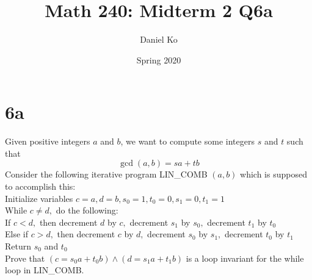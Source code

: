 \documentclass[11pt]{scrartcl}
\title{Math 240: Midterm 2 Q6a}
\author{Daniel Ko}
\date{Spring 2020}
\begin{document}
\maketitle

\section{6a}
Given positive integers $a$ and $b$, we want to compute some integers $s$ and $t$ such that
\[\operatorname{gcd}(a, b)=s a+t b\]
Consider the following iterative program LIN\_COMB $(a, b)$ which is supposed to accomplish this:\\
\hspace*{10mm}Initialize variables $c=a, d=b, s_{0}=1, t_{0}=0, s_{1}=0, t_{1}=1$\\
\hspace*{10mm}While $c \neq d,$ do the following:\\
\hspace*{20mm}If $c<d,$ then decrement $d$ by $c,$ decrement $s_{1}$ by $s_{0},$ decrement $t_{1}$ by $t_{0}$\\
\hspace*{20mm}Else if $c>d,$ then decrement $c$ by $d,$ decrement $s_{0}$ by $s_{1},$ decrement $t_{0}$ by $t_{1}$\\
\hspace*{10mm}Return $s_{0}$ and $t_{0}$\\
Prove that $(c=s_{0} a+t_{0} b) \wedge (d=s_{1} a+t_{1} b)$ is a loop invariant for the while loop in LIN\_COMB.
\end{document}
